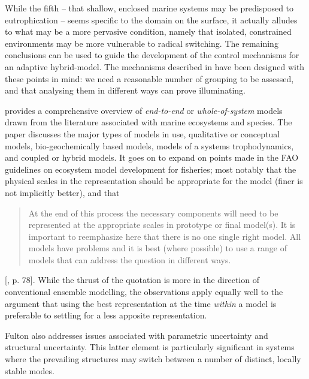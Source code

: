 While the fifth -- that shallow, enclosed marine systems may
be predisposed to eutrophication -- seems specific to the domain on
the surface, it actually alludes to what may be a more pervasive
condition, namely that isolated, constrained environments may be more
vulnerable to radical switching.  The remaining conclusions can be used
to guide the development of the control mechanisms for an adaptive
hybrid-model.  The mechanisms described in \Cfive have been designed with
these points in mind: we need a reasonable number of grouping to be
assessed, and that analysing them in different ways can prove
illuminating. 

\Cite{fulton2010approaches} provides a comprehensive overview
of \emph{end-to-end} or \emph{whole-of-system} models drawn from the
literature associated with marine ecosystems and species. 
The paper discusses the major types of models in use, qualitative or
conceptual models, bio-geochemically based models, models of a systems
trophodynamics, and coupled or hybrid models. It goes on to expand on
points made in the FAO guidelines on ecosystem model development for
fisheries; most notably that the physical scales in the representation
should be appropriate for the model (finer is not implicitly better), and
that
\begin{quote}
    At the end of this process the necessary components will need to
    be represented at the appropriate scales in prototype or final
    model(s). It is important to reemphasize here that there is no one
    single right model. All models have problems and it is best (where
    possible) to use a range of models that can address the question
    in different ways.
\end{quote} [\cite{FAO2008ecosystems}, p. 78].
While the thrust of the quotation is more in the direction of
conventional ensemble modelling, the observations apply equally well
to the argument that using the best representation at the
time \emph{within} a model is preferable to settling for a less
apposite representation.

Fulton also addresses issues associated with parametric uncertainty
and structural uncertainty.  This latter element is particularly
significant in systems where the prevailing structures may switch
between a number of distinct, locally stable modes.

